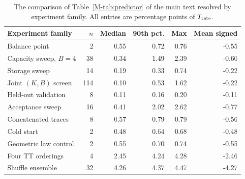 \begin{table}[htbp]
\centering\small
\begin{tabular}{lrrrrr}
\toprule
Experiment family & $n$ & Median & 90th pct. & Max & Mean signed\\\midrule
Balance point & 2 & 0.55 & 0.72 & 0.76 & -0.55\\
Capacity sweep, $B=4$ & 38 & 0.34 & 1.49 & 2.39 & -0.60\\
Storage sweep & 14 & 0.19 & 0.33 & 0.74 & -0.22\\
Joint $(K,B)$ screen & 114 & 0.10 & 0.53 & 1.62 & -0.22\\
Held-out validation & 8 & 0.11 & 0.16 & 0.20 & -0.11\\
Acceptance sweep & 16 & 0.41 & 2.02 & 2.62 & -0.77\\
Concatenated traces & 8 & 0.57 & 0.79 & 0.79 & -0.56\\
Cold start & 2 & 0.48 & 0.64 & 0.68 & -0.48\\
Geometric law control & 2 & 0.55 & 0.70 & 0.74 & -0.55\\
Four TT orderings & 4 & 2.45 & 4.24 & 4.28 & -2.46\\
Shuffle ensemble & 32 & 4.26 & 4.37 & 4.47 & -4.27\\
\bottomrule
\end{tabular}
\caption{The comparison of Table~\ref{M-tab:predictor} of the main text resolved by experiment family. All entries are percentage points of $T_{\rm rate}$.}
\label{tab:predictorfamily}
\end{table}
